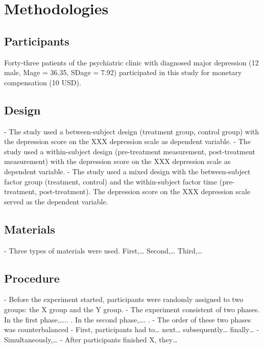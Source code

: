 \chapter{Methodologies}

\section{Participants}
\label{participants}

Forty-three patients of the psychiatric clinic with diagnosed major depression (12 male, Mage = 36.35, SDage = 7.92) participated in this study for monetary compensation (10 USD).

\section{Design}
\label{design}

- The study used a between-subject design (treatment group, control group) with the
depression score on the XXX depression scale as dependent variable.
- The study used a within-subject design (pre-treatment measurement, post-treatment
measurement) with the depression score on the XXX depression scale as dependent variable.
- The study used a mixed design with the between-subject factor group (treatment, control) and the within-subject factor time (pre-treatment, post-treatment). The depression score on the XXX depression scale served as the dependent variable.

\section{Materials}
\label{materials}

- Three types of materials were used. First,… Second,… Third,…

\section{Procedure}
\label{procedure}

- Before the experiment started, participants were randomly assigned to two groups: the X group and the Y group.
- The experiment consistent of two phases. In the first phase,….. . In the second phase,…. .
- The order of these two phases was counterbalanced
- First, participants had to… next… subsequently… finally…
- Simultaneously,…
- After participants finished X, they… \citep{swan_future_2016} %

